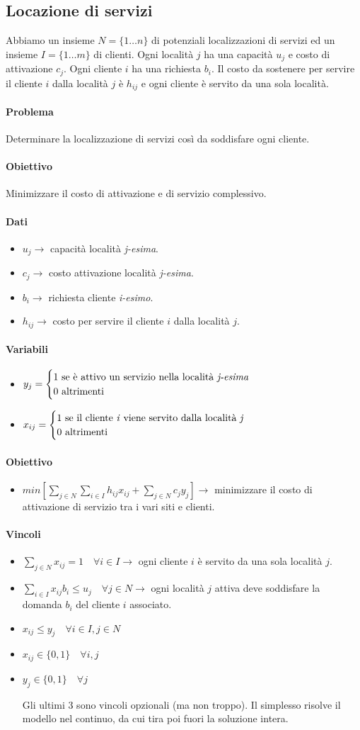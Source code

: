 \documentclass[12pt, twoside, letterpaper]{article}
\newcommand{\problemai}[5]{
	#1
	\begin{dati}
		\paragraph{Dati} 
			\begin{itemize}
				#2
			\end{itemize}
	\end{dati}
	\begin{variabili}
		\paragraph{Variabili} 
			\begin{itemize}
				#3
			\end{itemize}
	\end{variabili}
	\begin{obiettivo}
		\paragraph{Obiettivo} 
			\begin{itemize}
				#4
			\end{itemize}
	\end{obiettivo}
	\begin{vincoli}
		\paragraph{Vincoli}
			\begin{itemize}
				#5
			\end{itemize}
	\end{vincoli}
}
\begin{document}
			
		\subsection{Locazione di servizi}
			\problemai
			{
				Abbiamo un insieme $N = \{1 \dots n\}$ di potenziali localizzazioni di servizi ed un insieme $I = \{1 \dots m\}$ di clienti. Ogni località $j$ ha una capacità $u_j$ e costo di attivazione $c_j$. Ogni cliente $i$ ha una richiesta $b_i$. Il costo da sostenere per servire il cliente $i$ dalla località $j$ è $h_{ij}$ e ogni cliente è servito da una sola località.
				
				\paragraph{Problema} Determinare la localizzazione di servizi così da soddisfare ogni cliente.
				\paragraph{Obiettivo} Minimizzare il costo di attivazione e di servizio complessivo.
			}
			{
				\item $u_j \rightarrow$ capacità località \textit{j-esima}.
				\item $c_j \rightarrow$ costo attivazione località \textit{j-esima}.
				\item $b_i \rightarrow$ richiesta cliente \textit{i-esimo}.
				\item $h_{ij} \rightarrow$ costo per servire il cliente $i$ dalla località $j$.
			}
			{
				\item $y_j = \begin{cases} \text{1 se è attivo un servizio nella località \textit{j-esima}} \\ \text{0 altrimenti} \end{cases}$
				\item $x_{ij} = \begin{cases} \text{1 se il cliente \textit{i} viene servito dalla località \textit{j}} \\  \text{0 altrimenti} \end{cases}$
			}
			{
				\item $min [ \sum_{j \in N} \sum_{i \in I} h_{ij}x_{ij} + \sum_{j \in N} c_jy_j] \rightarrow$ minimizzare il costo di attivazione di servizio tra i vari siti e clienti.
			}
			{
				\item $\sum_{j \in N} x_{ij} = 1 \quad \forall i \in I \rightarrow$ ogni cliente $i$ è servito da una sola località $j$.
				\item $\sum_{i \in I} x_{ij} b_i \leq u_j \quad \forall j \in N \rightarrow$ ogni località $j$ attiva deve soddisfare la domanda $b_i$ del cliente $i$ associato.
				\item $x_{ij} \leq y_j \quad \forall i \in I, j \in N$
				\item $x_{ij} \in \{0,1\} \quad \forall i,j$
				\item $y_j \in \{0,1\} \quad \forall j$ 
				
				Gli ultimi 3 sono vincoli opzionali (ma non troppo). Il simplesso risolve il modello nel continuo, da cui tira poi fuori la soluzione intera.
			}
		
\end{document}
